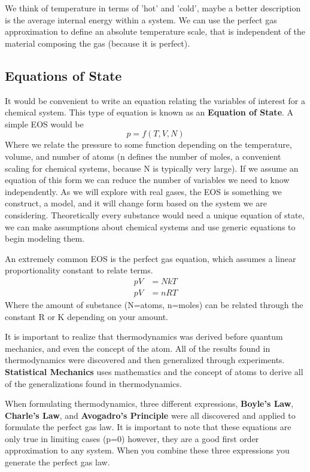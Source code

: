 \documentclass{article}
\newcommand{\be}{\begin{equation}}
\newcommand{\ee}{\end{equation}}
\begin{document}
We think of temperature in terms of 'hot' and 'cold', maybe a better description is the average internal energy within a system. 
We can use the perfect gas approximation to define an absolute temperature scale, that is independent of the material composing the gas (because it is perfect). 

\subsection*{Equations of State}
It would be convenient to write an equation relating the variables of interest for a chemical system.
This type of equation is known as an \textbf{Equation of State}. 
A simple EOS would be 
\be
p = f\left(T,V,N\right)
\ee
Where we relate the pressure to some function depending on the temperature, volume, and number of atoms (n defines the number of moles, a convenient scaling for chemical systems, because N is typically very large). 
If we assume an equation of this form we can reduce the number of variables we need to know independently. 
As we will explore with real gases, the EOS is something we construct, a model, and it will change form based on the system we are considering. 
Theoretically every substance would need a unique equation of state, we can make assumptions about chemical systems and use generic equations to begin modeling them. 

An extremely common EOS is the perfect gas equation, which assumes a linear proportionality constant to relate terms. 
\be
\begin{split}
pV &= NkT\\
pV &= nRT
\end{split}
\ee
Where the amount of substance (N=atoms, n=moles) can be related through the constant R or K depending on your amount. 

It is important to realize that thermodynamics was derived before quantum mechanics, and even the concept of the atom. 
All of the results found in thermodynamics were discovered and then generalized through experiments. 
\textbf{Statistical Mechanics} uses mathematics and the concept of atoms to derive all of the generalizations found in thermodynamics. 

When formulating thermodynamics, three different expressions, \textbf{Boyle's Law}, \textbf{Charle's Law}, and \textbf{Avogadro's Principle} were all discovered and applied to formulate the perfect gas law. 
It is important to note that these equations are only true in limiting cases (p=0) however, they are a good first order approximation to any system.
When you combine these three expressions you generate the perfect gas law. 
\end{document}
